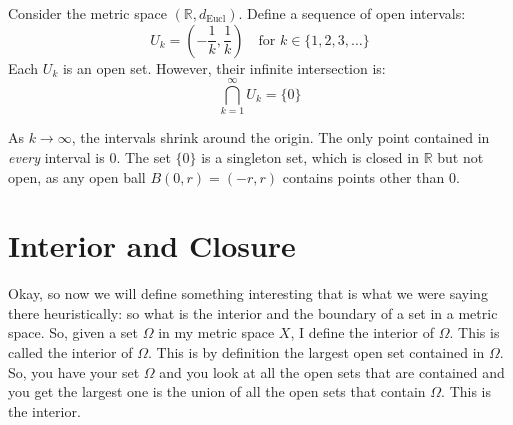 \begin{math-stroke}
\setcounter{theorem}{44}
\begin{example}\label{ex:infinite-intersection}
Consider the metric space $(\mathbb{R}, d_{\text{Eucl}})$. Define a sequence of open intervals:
\[ U_k = \left( -\frac{1}{k}, \frac{1}{k} \right) \quad \text{for } k \in \{1, 2, 3, \dots\} \]
Each $U_k$ is an open set. However, their infinite intersection is:
\[ \bigcap_{k=1}^{\infty} U_k = \{0\} \]
\begin{center}
\end{center}
\begin{explanation-of-steps}
As $k \to \infty$, the intervals shrink around the origin. The only point contained in \emph{every} interval is $0$. The set $\{0\}$ is a singleton set, which is closed in $\mathbb{R}$ but not open, as any open ball $B(0, r) = (-r, r)$ contains points other than $0$.
\end{explanation-of-steps}
\end{example}
\end{math-stroke}

\section{Interior and Closure}

\begin{spoken-clean}[00:26:39 - 00:28:30]
Okay, so now we will define something interesting that is what we were saying there heuristically: so what is the interior and the boundary of a set in a metric space. So, given a set $\Omega$ in my metric space $X$, I define the interior of $\Omega$. This is called the interior of $\Omega$. This is by definition the largest open set contained in $\Omega$. So, you have your set $\Omega$ and you look at all the open sets that are contained and you get the largest one is the union of all the open sets that contain $\Omega$. This is the interior.
\end{spoken-clean}

